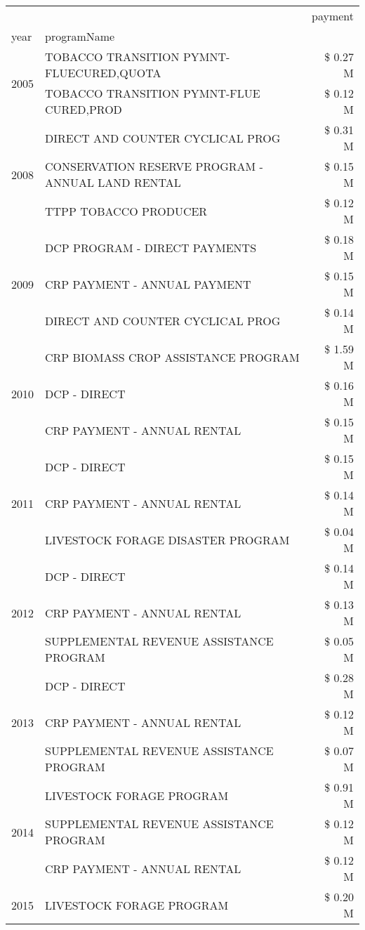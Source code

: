 \begin{tabular}{llr}
\toprule
 &  & payment \\
year & programName &  \\
\midrule
\multirow[t]{2}{*}{2005} & TOBACCO TRANSITION PYMNT-FLUECURED,QUOTA & \$ 0.27 M \\
 & TOBACCO TRANSITION PYMNT-FLUE CURED,PROD & \$ 0.12 M \\
\cline{1-3}
\multirow[t]{3}{*}{2008} & DIRECT AND COUNTER CYCLICAL PROG & \$ 0.31 M \\
 & CONSERVATION RESERVE PROGRAM - ANNUAL LAND RENTAL & \$ 0.15 M \\
 & TTPP TOBACCO PRODUCER & \$ 0.12 M \\
\cline{1-3}
\multirow[t]{3}{*}{2009} & DCP PROGRAM - DIRECT PAYMENTS & \$ 0.18 M \\
 & CRP PAYMENT - ANNUAL PAYMENT & \$ 0.15 M \\
 & DIRECT AND COUNTER CYCLICAL PROG & \$ 0.14 M \\
\cline{1-3}
\multirow[t]{3}{*}{2010} & CRP BIOMASS CROP ASSISTANCE PROGRAM & \$ 1.59 M \\
 & DCP - DIRECT & \$ 0.16 M \\
 & CRP PAYMENT - ANNUAL RENTAL & \$ 0.15 M \\
\cline{1-3}
\multirow[t]{3}{*}{2011} & DCP - DIRECT & \$ 0.15 M \\
 & CRP PAYMENT - ANNUAL RENTAL & \$ 0.14 M \\
 & LIVESTOCK FORAGE DISASTER PROGRAM & \$ 0.04 M \\
\cline{1-3}
\multirow[t]{3}{*}{2012} & DCP - DIRECT & \$ 0.14 M \\
 & CRP PAYMENT - ANNUAL RENTAL & \$ 0.13 M \\
 & SUPPLEMENTAL REVENUE ASSISTANCE PROGRAM & \$ 0.05 M \\
\cline{1-3}
\multirow[t]{3}{*}{2013} & DCP - DIRECT & \$ 0.28 M \\
 & CRP PAYMENT - ANNUAL RENTAL & \$ 0.12 M \\
 & SUPPLEMENTAL REVENUE ASSISTANCE PROGRAM & \$ 0.07 M \\
\cline{1-3}
\multirow[t]{3}{*}{2014} & LIVESTOCK FORAGE PROGRAM & \$ 0.91 M \\
 & SUPPLEMENTAL REVENUE ASSISTANCE PROGRAM & \$ 0.12 M \\
 & CRP PAYMENT - ANNUAL RENTAL & \$ 0.12 M \\
\cline{1-3}
\multirow[t]{3}{*}{2015} & LIVESTOCK FORAGE PROGRAM & \$ 0.20 M \\

\end{tabular}

